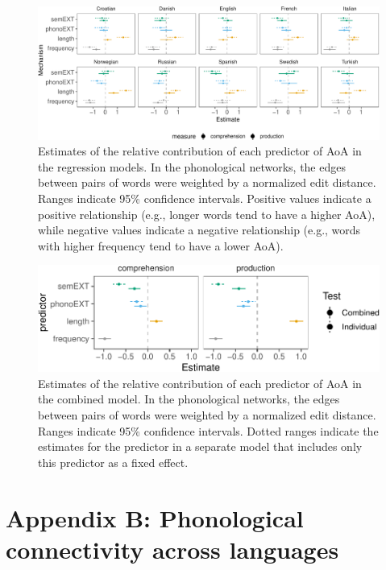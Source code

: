 \documentclass[english,,man,floatsintext]{apa6}
\begin{document}
\begin{figure}[!h]
\includegraphics[width=\textwidth]{ms_files/figure-latex/staticPrednt-1} \caption{Estimates of the relative contribution of each predictor of AoA in the regression models. In the phonological networks, the edges between pairs of words were weighted by a normalized edit distance. Ranges indicate 95\% confidence intervals. Positive values indicate a positive relationship (e.g., longer words tend to have a higher AoA), while negative values indicate a negative relationship (e.g., words with higher frequency tend to have a lower AoA).}\label{fig:staticPrednt}
\end{figure}

\begin{figure}[!h]
\includegraphics[width=\textwidth]{ms_files/figure-latex/staticAllnt-1} \caption{Estimates of the relative contribution of each predictor of AoA in the combined model. In the phonological networks, the edges between pairs of words were weighted by a normalized edit distance. Ranges indicate 95\% confidence intervals. Dotted ranges indicate the estimates for the predictor in a separate model that includes only this predictor as a fixed effect.}\label{fig:staticAllnt}
\end{figure}

\clearpage

\hypertarget{appendix-b-phonological-connectivity-across-languages}{%
\section{Appendix B: Phonological connectivity across languages}\label{appendix-b-phonological-connectivity-across-languages}}
\end{document}
